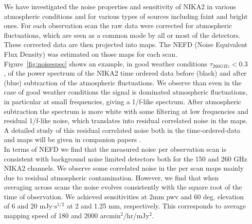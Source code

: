 \documentclass[]{aa} %
\begin{document}
We have investigated the noise properties and sensitivity of NIKA2 in various atmospheric conditions and for various types of sources including faint and bright ones. For each observation scan the raw data were corrected for atmospheric fluctuations, which are seen as a common mode by all or most of the detectors. These corrected data are then projected into maps. The NEFD (Noise Equivalent Flux Density) was estimated on those maps for each scan. \\

Figure~\ref{fig:noisespec} shows an example, in good weather conditions $\tau_{260 GHz} < 0.3$, of the power spectrum of the NIKA2 time ordered data before (black) and after (blue) subtraction of the atmospheric fluctuations.
We observe than even in the case of good weather conditions the signal is dominated atmospheric fluctuations, in particular at small frequencies, giving a 1/f-like spectrum. After atmospheric subtraction the spectrum is more white with some filtering at low frequencies and residual 1/f-like noise, which translates into residual correlated noise in the maps. A detailed study of this residual correlated noise both in the time-ordered-data and maps will be given in companion papers \cite{commissioning,pipeline}. \\

In terms of NEFD we find that the measured noise per observation scan is consistent with background noise limited detectors both for the 150 and 260 GHz NIKA2 channels. We observe some correlated noise in the per scan maps mainly due to residual atmospheric contamination. However, we find that when averaging across scans the noise evolves consistently with the square root of the time of observation. We achieved sensitivities at 2mm pwv and 60 deg. elevation of 6 and 20 mJy$\cdot\textrm{s}^{1/2}$ at 2 and 1.25 mm, respectively. This corresponds to average mapping speed of 180 and 2000 arcmin$^2$/hr/mJy$^2$. 
\end{document}
